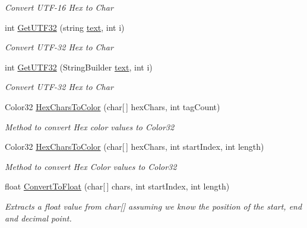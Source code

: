 \begin{DoxyCompactItemize}
\begin{DoxyCompactList}\small\item\em Convert U\+T\+F-\/16 Hex to Char \end{DoxyCompactList}\item 
int \mbox{\hyperlink{class_t_m_pro_1_1_t_m_p___text_add381cfff574155b2b44eddc9fedd883}{Get\+U\+T\+F32}} (string \mbox{\hyperlink{class_t_m_pro_1_1_t_m_p___text_a98a04e5078612c0586472bd510f91f5c}{text}}, int i)
\begin{DoxyCompactList}\small\item\em Convert U\+T\+F-\/32 Hex to Char \end{DoxyCompactList}\item 
int \mbox{\hyperlink{class_t_m_pro_1_1_t_m_p___text_a6045beb3d2ffa3d3ff56b6b68d5a99fd}{Get\+U\+T\+F32}} (String\+Builder \mbox{\hyperlink{class_t_m_pro_1_1_t_m_p___text_a98a04e5078612c0586472bd510f91f5c}{text}}, int i)
\begin{DoxyCompactList}\small\item\em Convert U\+T\+F-\/32 Hex to Char \end{DoxyCompactList}\item 
Color32 \mbox{\hyperlink{class_t_m_pro_1_1_t_m_p___text_a455f31609db404fc228b7208b97a3a74}{Hex\+Chars\+To\+Color}} (char\mbox{[}$\,$\mbox{]} hex\+Chars, int tag\+Count)
\begin{DoxyCompactList}\small\item\em Method to convert Hex color values to Color32 \end{DoxyCompactList}\item 
Color32 \mbox{\hyperlink{class_t_m_pro_1_1_t_m_p___text_ad2767b714fe3dab5354427dc493a3563}{Hex\+Chars\+To\+Color}} (char\mbox{[}$\,$\mbox{]} hex\+Chars, int start\+Index, int length)
\begin{DoxyCompactList}\small\item\em Method to convert Hex Color values to Color32 \end{DoxyCompactList}\item 
float \mbox{\hyperlink{class_t_m_pro_1_1_t_m_p___text_a939a6f39042a1079067970d796eeee6f}{Convert\+To\+Float}} (char\mbox{[}$\,$\mbox{]} chars, int start\+Index, int length)
\begin{DoxyCompactList}\small\item\em Extracts a float value from char\mbox{[}\mbox{]} assuming we know the position of the start, end and decimal point. \end{DoxyCompactList}\item 

\end{DoxyCompactItemize}
